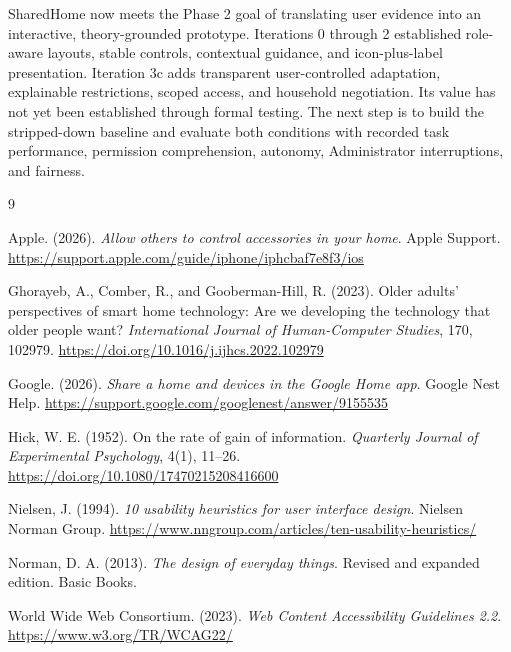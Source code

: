 \documentclass[11pt,letterpaper]{article}
\begin{document}
SharedHome now meets the Phase 2 goal of translating user evidence into an interactive,
theory-grounded prototype. Iterations 0 through 2 established role-aware layouts, stable
controls, contextual guidance, and icon-plus-label presentation. Iteration 3c adds transparent
user-controlled adaptation, explainable restrictions, scoped access, and household
negotiation. Its value has not yet been established through formal testing. The next step is
to build the stripped-down baseline and evaluate both conditions with recorded task
performance, permission comprehension, autonomy, Administrator interruptions, and fairness.

\begin{thebibliography}{9}

Apple. (2026).
\newblock \emph{Allow others to control accessories in your home}.
\newblock Apple Support.
\newblock \url{https://support.apple.com/guide/iphone/iphcbaf7e8f3/ios}

Ghorayeb, A., Comber, R., and Gooberman-Hill, R. (2023).
\newblock Older adults' perspectives of smart home technology: Are we developing the technology that older people want?
\newblock \emph{International Journal of Human-Computer Studies}, 170, 102979.
\newblock \url{https://doi.org/10.1016/j.ijhcs.2022.102979}

Google. (2026).
\newblock \emph{Share a home and devices in the Google Home app}.
\newblock Google Nest Help.
\newblock \url{https://support.google.com/googlenest/answer/9155535}

Hick, W. E. (1952).
\newblock On the rate of gain of information.
\newblock \emph{Quarterly Journal of Experimental Psychology}, 4(1), 11--26.
\newblock \url{https://doi.org/10.1080/17470215208416600}

Nielsen, J. (1994).
\newblock \emph{10 usability heuristics for user interface design}.
\newblock Nielsen Norman Group.
\newblock \url{https://www.nngroup.com/articles/ten-usability-heuristics/}

Norman, D. A. (2013).
\newblock \emph{The design of everyday things}. Revised and expanded edition.
\newblock Basic Books.

World Wide Web Consortium. (2023).
\newblock \emph{Web Content Accessibility Guidelines 2.2}.
\newblock \url{https://www.w3.org/TR/WCAG22/}

\end{thebibliography}
\end{document}
